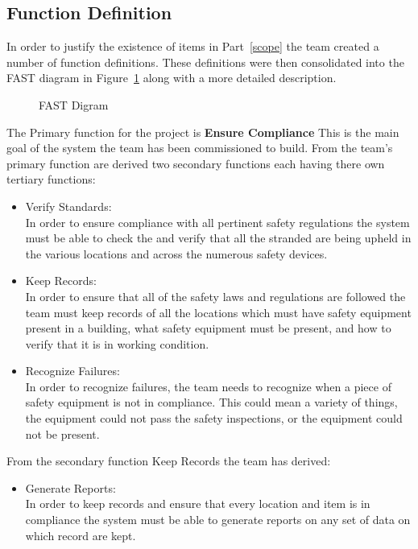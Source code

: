 \documentclass[Letter,11pt]{article}
\begin{document}
	\subsection{Function Definition} 
		In order to justify the existence of items in Part~\ref{scope} the team created a number of function definitions. These definitions were then consolidated into the FAST diagram in Figure~\ref{fast1} along with a more detailed description.
		\begin{figure}[h]
			\centering
			
			\caption{\label{fast1} FAST Digram}
		\end{figure}
		The Primary function for the project is \textbf{Ensure Compliance} This is the main goal of the system the team has been commissioned to build. From the team's primary function are derived two secondary functions each having there own tertiary functions:
		\begin{itemize}
			\item Verify Standards:\\
			In order to ensure compliance with all pertinent safety regulations the system must be able to check the and verify that all the stranded are being upheld in the various locations and across the numerous safety devices.
			\item Keep Records:\\
			In order to ensure that all of the safety laws and regulations are followed the team must keep records of all the locations which must have safety equipment present in a building, what safety equipment must be present, and how to verify that it is in working condition.  

			\item Recognize Failures:\\
			In order to recognize failures, the team needs to recognize when a piece of safety equipment is not in compliance. This could mean a variety of things, the equipment could not pass the safety inspections, or the equipment could not be present.   

		\end{itemize}
		From the secondary function Keep Records the team has derived: 
		\begin{itemize}
			\item Generate Reports:\\
			In order to keep records and ensure that every location and item is in compliance the system must be able to generate reports on any set of data on which record are kept. 
		\end{itemize}
\end{document}

